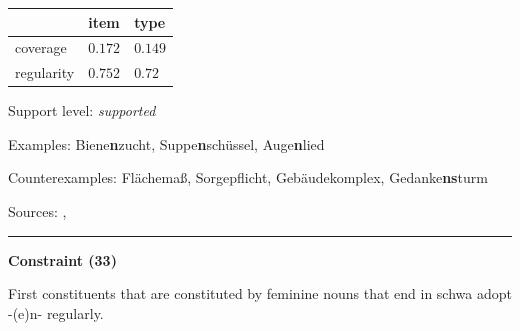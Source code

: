 \vspace{-0.25em}

\begin{table}[!ht]
\begin{center}
\setlength{\extrarowheight}{1pt}
\begin{tabularx}{\columnwidth}{|X|X|X|}
\hline
 & item & type \\
\hline
 coverage & $0.172$ & $0.149$ \\
\hline
 regularity & $0.752$ & $0.72$ \\
\hline
\end{tabularx}
\end{center}
\end{table}

\vspace{-1.35em}

\noindent
Support level: \textit{supported}

\vspace{0.3em}

\noindent
Examples: Biene\textbf{n}zucht, Suppe\textbf{n}schüssel, Auge\textbf{n}lied

\noindent
Counterexamples: Fläche{\zeroLinker}maß, Sorge{\zeroLinker}pflicht, Gebäude{\zeroLinker}komplex, Gedanke\textbf{ns}turm

\vspace{0.3em}

\noindent
Sources: \citet[18]{kuerschner_2010}, \citet[83, 92]{ortner_mueller-bollhagen_1991}

\vspace{0.35em}
\hrule




\vspace{0.4em}

\begin{center}
\textbf{Constraint (33)}
\end{center}

\noindent
First constituents that are constituted by feminine nouns that end in schwa adopt -(e)n- regularly.
\vspace{0.5em}


